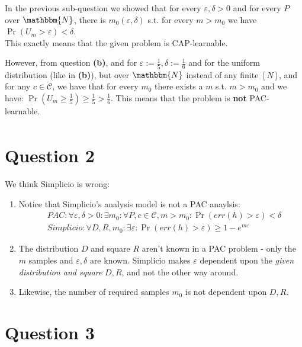 \documentclass[a4paper]{article}
\renewcommand{\epsilon}{\varepsilon}
\newcommand{\N}{\mathbbm{N}}
\newcommand{\qedsquare}{\tag*{$\square$}}
\begin{document}
In the previous sub-question we showed that for every $ \epsilon, \delta > 0 $ and for every $P$ over $\N$,
there is $ m_0(\epsilon,\delta) $ s.t. for every $ m > m_0 $ we have $ \Pr(U_m > \epsilon) < \delta $. \\
This exactly means that the given problem is CAP-learnable.

However, from question \textbf{(b)}, and for $ \epsilon := \frac{1}{5}, \delta := \frac{1}{6} $ and for the uniform distribution
(like in \textbf{(b)}), but over $\N$ instead of any finite $[N]$, and for any $ c \in \mathcal{C} $,
we have that for every $m_0$ there exists a $m$ s.t. $m>m_0$ and we have:
$ \Pr(U_m \geq \frac{1}{5}) \geq \frac{1}{5} > \frac{1}{6} $.
This means that the problem is \textbf{not} PAC-learnable.
\begin{align*}\qedsquare\end{align*}

\newpage

\section {Question 2}

We think Simplicio is wrong:

\begin{enumerate}
    \item Notice that Simplicio's analysis model is not a PAC anaylsis:
        \begin{align*}
            &PAC: \forall \epsilon , \delta > 0 : \exists m_0 : \forall P, c\in\mathcal{C}, m>m_0
            : \Pr( err(h) > \epsilon ) <\delta \\
            &Simplicio: \forall D, R, m_0 : \exists \epsilon : \Pr( err(h) > \epsilon ) \geq 1 - e^{m\epsilon}
        \end{align*}

    \item The distribution $D$ and square $R$ aren't known in a PAC problem -
        only the $m$ samples and $\epsilon,\delta$ are known.
        Simplicio makes $\epsilon$ dependent upon the \textit{given distribution and square} $D,R$, and not the other way around.

    \item Likewise, the number of required samples $m_0$ is not dependent upon $D,R$.
\end{enumerate}

\section {Question 3}
\end{document}
